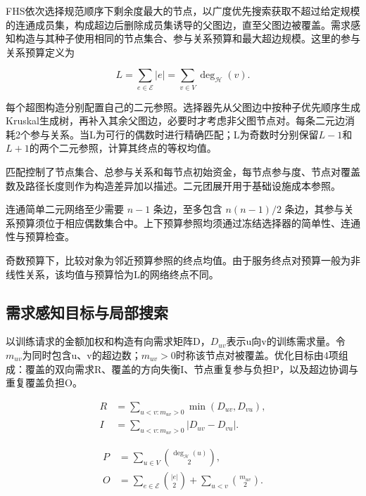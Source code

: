 \documentclass[UTF8,a4paper,twocolumn,fontset=none,zihao=5]{ctexart}
\begin{document}
FHS依次选择规范顺序下剩余度最大的节点，以广度优先搜索获取不超过给定规模的连通成员集，构成超边后删除成员集诱导的父图边，直至父图边被覆盖。需求感知构造与其种子使用相同的节点集合、参与关系预算和最大超边规模。这里的参与关系预算定义为



\begin{equation}
L=\sum_{e\in\mathcal E}|e|=\sum_{v\in V}\deg_{\mathcal H}(v).
\label{eq:8}\end{equation}


每个超图构造分别配置自己的二元参照。选择器先从父图边中按种子优先顺序生成Kruskal生成树，再补入其余父图边，必要时才考虑非父图节点对。每条二元边消耗2个参与关系。当L为可行的偶数时进行精确匹配；L为奇数时分别保留$L-1$和$L+1$的两个二元参照，计算其终点的等权均值。


匹配控制了节点集合、总参与关系和每节点初始资金，每节点参与度、节点对覆盖数及路径长度则作为构造差异加以描述。二元团展开用于基础设施成本参照。


连通简单二元网络至少需要 $n-1$ 条边，至多包含 $n(n-1)/2$ 条边，其参与关系预算须位于相应偶数集合中。上下预算参照均须通过冻结选择器的简单性、连通性与预算检查。


奇数预算下，比较对象为邻近预算参照的终点均值。由于服务终点对预算一般为非线性关系，该均值与预算恰为L的网络终点不同。


\subsection{需求感知目标与局部搜索}

以训练请求的金额加权和构造有向需求矩阵D，$D_{uv}$表示u向v的训练需求量。令$m_{uv}$为同时包含u、v的超边数；$m_{uv}>0$时称该节点对被覆盖。优化目标由4项组成：覆盖的双向需求R、覆盖的方向失衡I、节点重复参与负担P，以及超边协调与重复覆盖负担O。



\begin{equation}
\begin{aligned}R&=\sum_{u<v:m_{uv}>0}\min(D_{uv},D_{vu}),\\I&=\sum_{u<v:m_{uv}>0}|D_{uv}-D_{vu}|.\end{aligned}
\label{eq:9}\end{equation}



\begin{equation}
\begin{aligned}P&=\sum_{u\in V}\binom{\deg_{\mathcal H}(u)}{2},\\O&=\sum_{e\in\mathcal E}\binom{|e|}{2}+\sum_{u<v}\binom{m_{uv}}{2}.\end{aligned}
\label{eq:10}\end{equation}
\end{document}
